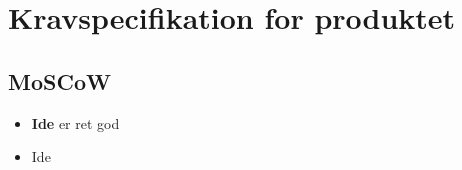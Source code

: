 \section{Kravspecifikation for produktet}

\subsection{MoSCoW}
\begin{itemize}
    \item \textbf{Ide} er ret god
    \item Ide
\end{itemize}